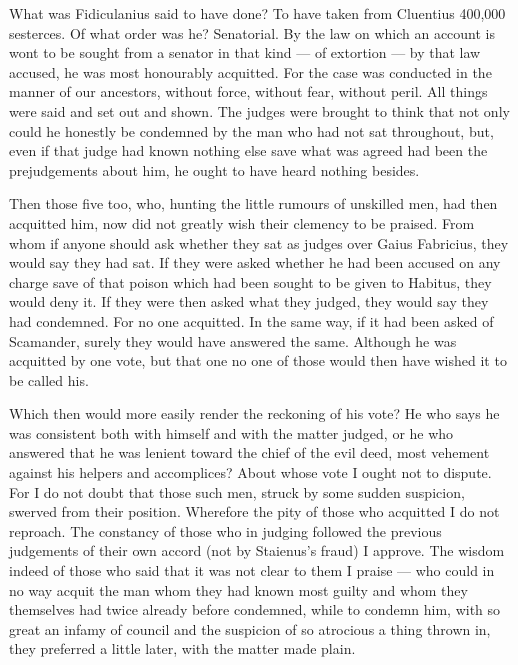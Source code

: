  What was Fidiculanius said to have done? To have taken from Cluentius 400,000 sesterces. Of what order was he? Senatorial. By the law on which an account is wont to be sought from a senator in that kind --- of extortion --- by that law accused, he was most honourably acquitted. For the case was conducted in the manner of our ancestors, without force, without fear, without peril. All things were said and set out and shown. The judges were brought to think that not only could he honestly be condemned by the man who had not sat throughout, but, even if that judge had known nothing else save what was agreed had been the prejudgements about him, he ought to have heard nothing besides.

 Then those five too, who, hunting the little rumours of unskilled men, had then acquitted him, now did not greatly wish their clemency to be praised. From whom if anyone should ask whether they sat as judges over Gaius Fabricius, they would say they had sat. If they were asked whether he had been accused on any charge save of that poison which had been sought to be given to Habitus, they would deny it. If they were then asked what they judged, they would say they had condemned. For no one acquitted. In the same way, if it had been asked of Scamander, surely they would have answered the same. Although he was acquitted by one vote, but that one no one of those would then have wished it to be called his.

 Which then would more easily render the reckoning of his vote? He who says he was consistent both with himself and with the matter judged, or he who answered that he was lenient toward the chief of the evil deed, most vehement against his helpers and accomplices? About whose vote I ought not to dispute. For I do not doubt that those such men, struck by some sudden suspicion, swerved from their position. Wherefore the pity of those who acquitted I do not reproach. The constancy of those who in judging followed the previous judgements of their own accord (not by Staienus's fraud) I approve. The wisdom indeed of those who said that it was not clear to them I praise --- who could in no way acquit the man whom they had known most guilty and whom they themselves had twice already before condemned, while to condemn him, with so great an infamy of council and the suspicion of so atrocious a thing thrown in, they preferred a little later, with the matter made plain.


